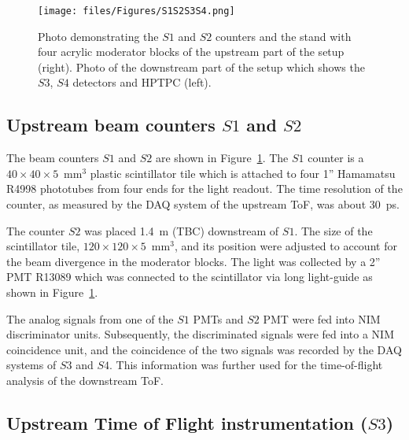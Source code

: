     
    \begin{figure}[t]
      \centering
    \texttt{[image: files/Figures/S1S2S3S4.png]}
    	\caption{Photo demonstrating the $S1$ and $S2$ counters and the stand with four acrylic moderator blocks of the upstream part of the setup (right). Photo of the downstream part of the setup which shows the $S3$, $S4$ detectors and HPTPC (left).}
    		\label{fig:modblocks}
    \end{figure}
    
    
	\subsection{Upstream beam counters $S1$ and $S2$}
	
	The beam counters $S1$ and $S2$ are shown in Figure~\ref{fig:modblocks}. The $S1$ counter is a $40\times40\times5$~mm$^3$ plastic scintillator tile which is attached to four 1'' Hamamatsu R4998 phototubes from four ends for the light readout. The time resolution of the counter, as measured by the DAQ system of the upstream ToF, was about 30~ps. 
	
	The counter $S2$ was placed 1.4~m (TBC) downstream of $S1$. The size of the scintillator tile, $120\times120\times5$~mm$^3$, and its position were adjusted to account for the beam divergence in the moderator blocks. The light was collected by a 2'' PMT R13089 which was connected to the scintillator via long light-guide as shown in Figure~\ref{fig:modblocks}. 
	
	The analog signals from one of the $S1$ PMTs and $S2$ PMT were fed into NIM discriminator units.
	Subsequently, the discriminated signals were fed into a NIM coincidence unit, and the coincidence of the two signals was recorded by the DAQ systems of $S3$ and $S4$. This information was further used for the time-of-flight analysis of the downstream ToF. 

    
\subsection{Upstream Time of Flight instrumentation ($S3$)}

